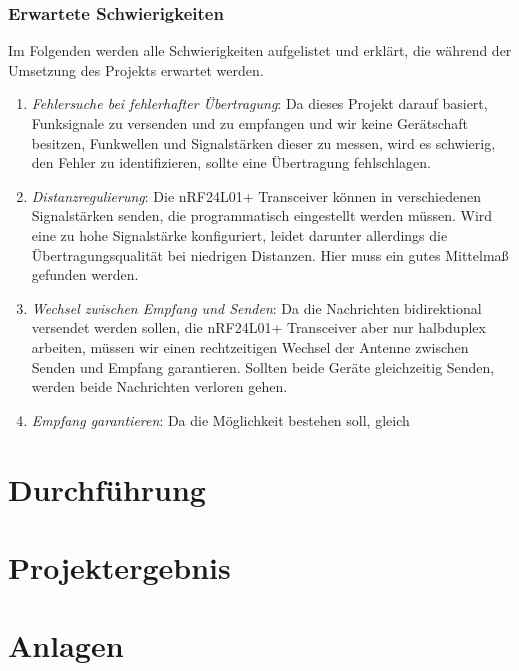 \documentclass[a4paper, 11pt]{scrartcl}
\begin{document}
\subsubsection{Erwartete Schwierigkeiten}
Im Folgenden werden alle Schwierigkeiten aufgelistet und erklärt, die während der Umsetzung des Projekts erwartet werden.
\begin{enumerate}
    \item \textit{Fehlersuche bei fehlerhafter Übertragung}: Da dieses Projekt darauf basiert, Funksignale zu versenden und zu empfangen und wir keine Gerätschaft
            besitzen, Funkwellen und Signalstärken dieser zu messen, wird es schwierig, den Fehler zu identifizieren, sollte eine Übertragung fehlschlagen.
    \item \textit{Distanzregulierung}: Die nRF24L01+ Transceiver können in verschiedenen Signalstärken senden, die programmatisch eingestellt werden müssen.
            Wird eine zu hohe Signalstärke konfiguriert, leidet darunter allerdings die Übertragungsqualität bei niedrigen Distanzen. Hier muss ein gutes Mittelmaß
            gefunden werden.
    \item \textit{Wechsel zwischen Empfang und Senden}: Da die Nachrichten bidirektional versendet werden sollen, die nRF24L01+ Transceiver aber nur halbduplex arbeiten,
            müssen wir einen rechtzeitigen Wechsel der Antenne zwischen Senden und Empfang garantieren. Sollten beide Geräte gleichzeitig Senden, werden beide Nachrichten
            verloren gehen.
    \item \textit{Empfang garantieren}: Da die Möglichkeit bestehen soll, gleich 
\end{enumerate}

\section{Durchführung}

\section{Projektergebnis}

\newpage
\section{Anlagen}
\end{document}
